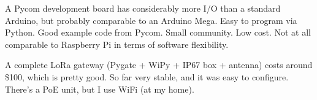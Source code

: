 A Pycom development board has considerably more I/O than a standard Arduino, but probably comparable to an Arduino Mega. Easy to program via Python. Good example code from Pycom. Small community. Low cost. Not at all comparable to Raspberry Pi in terms of software flexibility.

A complete LoRa gateway (Pygate + WiPy + IP67 box + antenna) costs around \$100, which is pretty good. So far very stable, and it was easy to configure. There's a PoE unit, but I use WiFi (at my home).

